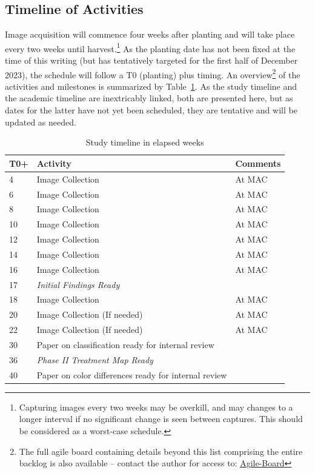 \documentclass[12pt]{article}
\begin{document}
\subsection{Timeline of Activities}
Image acquisition will commence four weeks after planting and will take place every two weeks until harvest.\footnote{Capturing images every two weeks may be overkill, and may changes to a longer interval if no significant change is seen between captures. This should be considered as a worst-case schedule.} As the planting date has not been fixed at the time of this writing (but has tentatively targeted for the first half of December 2023), the schedule will follow a T0 (planting) plus timing. An overview\footnote{The full agile board containing details beyond this list comprising the entire backlog is also available -- contact the author for access to: \href{https://evan-mcginnis.atlassian.net/jira/software/c/projects/WEED/boards/1}{Agile-Board}} of the activities and milestones is summarized by Table~\ref{tab:timeline}. As the study timeline and the academic timeline are inextricably linked, both are presented here, but as dates for the latter have not yet been scheduled, they are tentative and will be updated as needed.
\begin{table}[ht]
	\centering
    \caption{Study timeline in elapsed weeks}
    \label{tab:timeline}
    \begin{tabular}[t]{lll} 
		\textbf{T0+} & \textbf{Activity} &\textbf{Comments}\\
		\midrule
			4 & Image Collection & At MAC\\
			6 & Image Collection & At MAC\\
			8 & Image Collection & At MAC\\
			10 & Image Collection & At MAC\\
			12 & Image Collection & At MAC\\
			14 & Image Collection & At MAC\\
			16 & Image Collection & At MAC\\
			17 & \textit{Initial Findings Ready} & \\
			18 & Image Collection & At MAC\\
			20 & Image Collection (If needed) & At MAC \\
			22 & Image Collection (If needed) & At MAC \\
			30 & Paper on classification ready for internal review & \\
			36 & \textit{Phase II Treatment Map Ready} & \\
			40 & Paper on color differences ready for internal review & \\
    \end{tabular}
\end{table}
\end{document}
